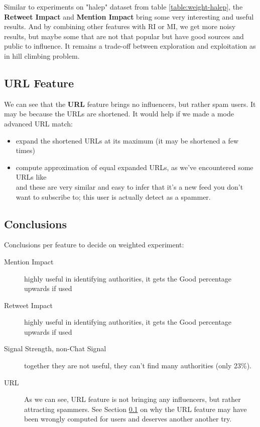 Similar to experiments on "halep" dataset from table \ref{table:weight-halep}, the \textbf{Retweet Impact} and \textbf{Mention Impact} bring some very interesting and useful results.
And by combining other features with RI or MI, we get more noisy results, but maybe some that are not that popular but have good sources and public to influence. It remains a trade-off between exploration and exploitation as in hill climbing problem.

\subsection{URL Feature}
\label{subsec:url-feature}

We can see that the \textbf{URL} feature brings no influencers, but rather spam users. It may be because the URLs are shortened. It would help if we made a mode advanced URL match:
\begin{itemize}
	\item expand the shortened URLs at its maximum (it may be shortened a few times)
    \item compute approximation of equal expanded URLs, as we've encountered some URLs like\\  and these are very similar and easy to infer that it's a new feed you don't want to subscribe to; this user is actually detect as a spammer.
\end{itemize}


\subsection{Conclusions}

Conclusions per feature to decide on weighted experiment:

\begin{description}
	\item[Mention Impact] highly useful in identifying authorities, it gets the Good percentage upwards if used
	\item[Retweet Impact] highly useful in identifying authorities, it gets the Good percentage upwards if used
    \item[Signal Strength, non-Chat Signal] together they are not useful, they can't find many authorities (only 23\%).
    \item[URL] As we can see, URL feature is not bringing any influencers, but rather attracting spammers. See Section \ref{subsec:url-feature} on why the URL feature may have been wrongly computed for users and deserves another another try.
\end{description}


